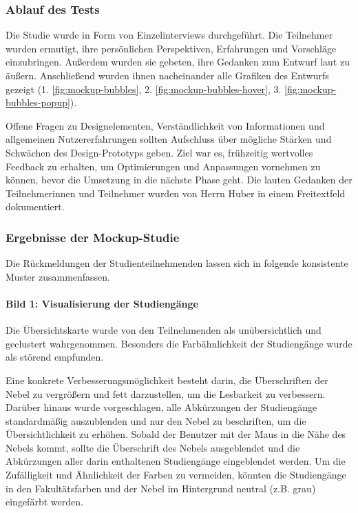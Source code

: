 \subsubsection{Ablauf des Tests}
Die Studie wurde in Form von Einzelinterviews durchgeführt. Die Teilnehmer wurden ermutigt, ihre persönlichen Perspektiven, Erfahrungen und Vorschläge einzubringen. Außerdem wurden sie gebeten, ihre Gedanken zum Entwurf laut zu äußern. Anschließend wurden ihnen nacheinander alle Grafiken des Entwurfs gezeigt (1. \autoref{fig:mockup-bubbles},
2. \autoref{fig:mockup-bubbles-hover}, 3. \autoref{fig:mockup-bubbles-popup}). 

Offene Fragen zu Designelementen, Verständlichkeit von Informationen und allgemeinen Nutzererfahrungen sollten Aufschluss über mögliche Stärken und Schwächen des Design-Proto\-typs geben. Ziel war es, frühzeitig wertvolles Feedback zu erhalten, um Optimierungen und Anpassungen vornehmen zu können, bevor die Umsetzung in die nächste Phase geht. Die lauten Gedanken der Teilnehmerinnen und Teilnehmer wurden von Herrn Huber in einem Freitextfeld dokumentiert.

\subsubsection{Ergebnisse der Mockup-Studie}
Die Rückmeldungen der Studienteilnehmenden lassen sich in folgende konsistente
Muster zusammenfassen.

\paragraph{Bild 1: Visualisierung der Studiengänge}\label{sec:visualisierung-der-studiengänge}
Die Übersichtskarte wurde von den Teilnehmenden als unübersichtlich und geclustert wahrgenommen. Besonders die Farbähnlichkeit der Studiengänge wurde als störend
empfunden.

Eine konkrete Verbesserungsmöglichkeit besteht darin, die Überschriften der Nebel zu vergrößern und fett darzustellen, um die Lesbarkeit zu verbessern. Darüber hinaus wurde vorgeschlagen, alle Abkürzungen der Studiengänge standardmäßig auszublenden und nur den Nebel zu beschriften, um die Übersichtlichkeit zu erhöhen. Sobald der Benutzer mit der Maus in die Nähe des Nebels kommt, sollte die Überschrift des Nebels ausgeblendet und die Abkürzungen aller darin enthaltenen Studiengänge eingeblendet werden. Um die Zufälligkeit und Ähnlichkeit der Farben zu vermeiden, könnten die Studiengänge in den Fakultätsfarben und der Nebel im Hintergrund neutral (z.B. grau) eingefärbt werden.

